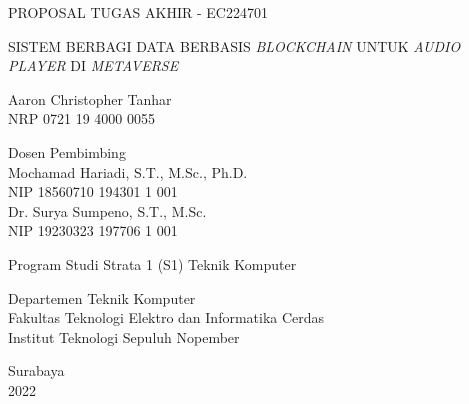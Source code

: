 \begin{large}
  PROPOSAL TUGAS AKHIR - EC224701
\end{large}

\vspace{\fill}

\begin{spacing}{1.5}
  \begin{Large}
    SISTEM BERBAGI DATA BERBASIS \emph{BLOCKCHAIN} UNTUK \emph{AUDIO PLAYER}
    DI \emph{METAVERSE}
\end{Large}
\end{spacing}

\vspace{\fill}

\begin{large}
  Aaron Christopher Tanhar \\
  \textmd{NRP 0721 19 4000 0055}
\end{large}

\vspace{\fill}

\begin{large}
  \textmd{Dosen Pembimbing} \\
  Mochamad Hariadi, S.T., M.Sc., Ph.D. \\
  \textmd{NIP 18560710 194301 1 001} \\
  Dr. Surya Sumpeno, S.T., M.Sc. \\
  \textmd{NIP 19230323 197706 1 001}
\end{large}

\vspace{\fill}

Program Studi Strata 1 (S1) Teknik Komputer \\

\mdseries

Departemen Teknik Komputer \\
Fakultas Teknologi Elektro dan Informatika Cerdas \\
Institut Teknologi Sepuluh Nopember

Surabaya \\
2022
